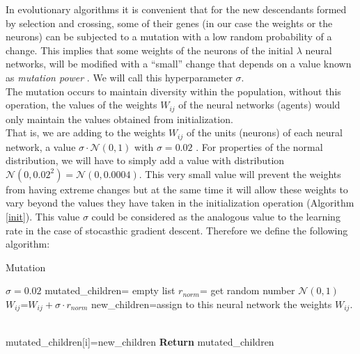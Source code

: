 \documentclass{iosart2c}
\begin{document}
In evolutionary algorithms it is convenient that for the new descendants formed by selection and crossing, some of their genes (in our case the weights or the neurons) can be subjected to a mutation with a low random probability of a change. This implies that some weights of the neurons of the initial $\lambda$ neural networks, will be modified with a ``small'' change that depends on a value known as \textit{mutation power} \cite{deepGA}. We will call this hyperparameter $\sigma$. \\

The mutation occurs to maintain diversity within the population, without this operation, the values of the weights $W_{ij}$ of the neural networks (agents) would only maintain the values obtained from initialization.\\

That is, we are adding to the weights $W_{ij}$ of the units (neurons) of each neural network, a value $\sigma\cdot \mathcal{N}(0,1)$ with $\sigma=0.02$ . For properties of the normal distribution, we will have to simply add a value with distribution $\mathcal{N}(0,0.02^2)=\mathcal{N}(0,0.0004)$. This very small value will prevent the weights from having extreme changes but at the same time it will allow these weights to vary beyond the values they have taken in the initialization operation (Algorithm \ref{init}). This value $\sigma$ could be considered as the analogous value to the learning rate in the case of stocasthic gradient descent. Therefore we define the following algorithm: \\



\begin{algorithm}[h!]
\caption{Mutation} \label{mutation}
\begin{algorithmic}[1]
\State $\sigma=0.02$ 
\State mutated\_children= empty list
     
                \State $r_{norm}$= get random number $\mathcal{N}(0,1)$
                \State $W_{ij}$=$W_{ij}+\sigma\cdot r_{norm}$ 
                \State new\_children=assign to this neural network the weights $W_{ij}$.
            
\EndFor \\
        \State mutated\_children[i]=new\_children
\EndFor
\State \textbf{Return} mutated\_children
\EndFunction
\end{algorithmic}
\end{algorithm}
\end{document}

